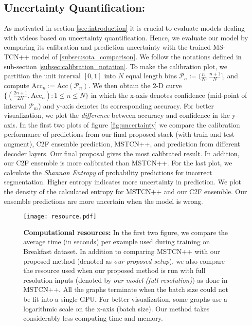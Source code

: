 \documentclass[10pt,twocolumn,letterpaper]{article}
\newcommand{\calP}{\mathcal{P}}
\newcommand{\acc}{\ensuremath{\text{Acc}}}
\begin{document}
\subsection{Uncertainty Quantification:}\label{subsec:uncertainty_quantification}

As motivated in section \ref{sec:introduction} it is crucial to evaluate models dealing with videos based on uncertainty quantification.
Hence, we evaluate our model by comparing its calibration and prediction uncertainty with the trained MS-TCN++ model of \ref{subsec:sota_comparison}. We follow the notations defined in sub-section \ref{subsec:calibration_notation}. To make the calibration plot, we partition the unit interval $[0,1]$ into $N$ equal length bins $\calP_n := (\frac{n}{N}, \frac{n+1}{N}]$, and compute $\acc_n := \acc(\calP_n)$. We then obtain the 2-D curve $\{(\frac{2n+1}{2N}, \acc_n): 1\!\le\!n\!\le\!N\}$ in which the x-axis denotes confidence (mid-point of interval $\calP_m$) and y-axis denotes its corresponding accuracy. For better visualization, we plot the \textit{difference} between accuracy and confidence in the y-axis. In the first two plots of figure \ref{fig:uncertainty} we compare the calibration performance of predictions from our final proposed stack (with train and test augment), C2F ensemble prediction, MSTCN++, and prediction from different decoder layers. Our final proposal gives the most calibrated result. In addition, our C2F ensemble is more calibrated than MSTCN++. For the last plot, we calculate the \textit{Shannon Entropy} of probability predictions for incorrect segmentation. Higher entropy indicates more uncertainty in prediction. We plot the density of the calculated entropy for MSTCN++ and our C2F ensemble. Our ensemble predictions are more uncertain when the model is wrong.


\begin{figure*}[ht!]
\centering
\texttt{[image: resource.pdf]}
\caption{\textbf{Computational resources:} In the first two figure, we compare the average time (in seconds) per example used during training on Breakfast dataset. In addition to comparing MSTCN++ with our proposed method (denoted as \textit{our proposed setup}), we also compare the resource used when our proposed method is run with full resolution inputs (denoted by \textit{our model (full resolution)}) as done in MSTCN++. All the graphs terminate when the batch size could not be fit into a single GPU. For better visualization, some graphs use a logarithmic scale on the x-axis (batch size). Our method takes considerably less computing time and memory.}
\label{fig:resources}
\end{figure*}
\end{document}
